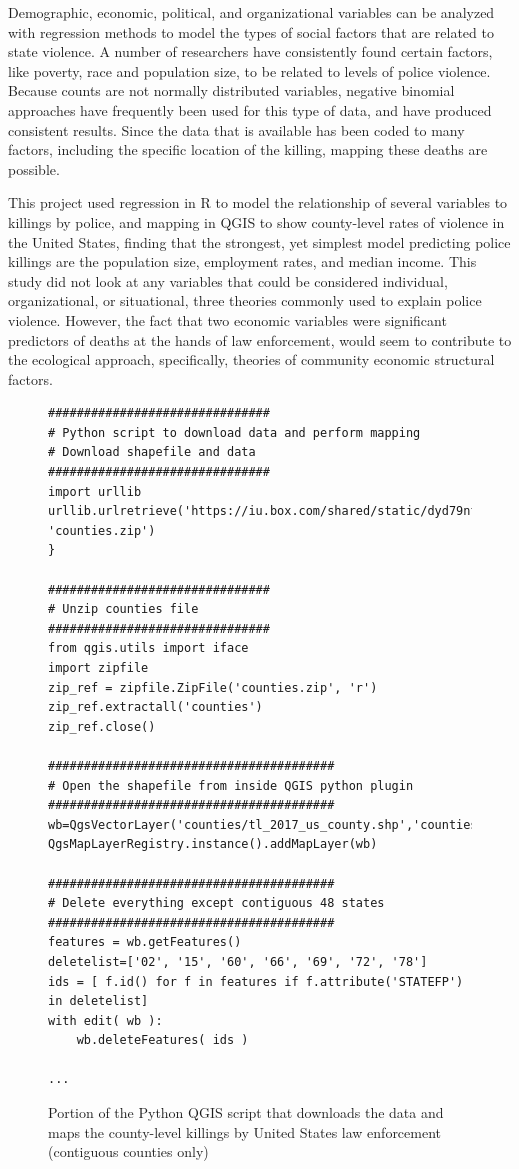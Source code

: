 \documentclass[sigconf]{acmart}
\begin{document}
Demographic, economic, political, and organizational variables can be analyzed with regression methods to model the types of social factors that are related to state violence.  A number of researchers have consistently found certain factors, like poverty, race and population size, to be related to levels of police violence.  Because counts are not normally distributed variables, negative binomial approaches have frequently been used for this type of data, and have produced consistent results.  Since the data that is available has been coded to many factors, including the specific location of the killing, mapping these deaths are possible.  

This project used regression in R to model the relationship of several variables to killings by police, and mapping in QGIS to show county-level rates of violence in the United States, finding that the strongest, yet simplest model predicting police killings are the population size, employment rates, and median income.  This study did not look at any variables that could be considered individual, organizational, or situational, three theories commonly used to explain police violence.  However, the fact that two economic variables were significant predictors of deaths at the hands of law enforcement, would seem to contribute to the ecological approach, specifically, theories of community economic structural factors.

 

\begin{figure}[htb]
\begin{verbatim}
###############################
# Python script to download data and perform mapping
# Download shapefile and data
###############################
import urllib 
urllib.urlretrieve('https://iu.box.com/shared/static/dyd79nfosj25kdqo4hk0me1tmhrbn275.zip', 'counties.zip')
}

###############################
# Unzip counties file
###############################
from qgis.utils import iface
import zipfile
zip_ref = zipfile.ZipFile('counties.zip', 'r')
zip_ref.extractall('counties')
zip_ref.close()

########################################
# Open the shapefile from inside QGIS python plugin
########################################
wb=QgsVectorLayer('counties/tl_2017_us_county.shp','counties','ogr')
QgsMapLayerRegistry.instance().addMapLayer(wb)

########################################
# Delete everything except contiguous 48 states
########################################
features = wb.getFeatures()
deletelist=['02', '15', '60', '66', '69', '72', '78']
ids = [ f.id() for f in features if f.attribute('STATEFP') in deletelist]
with edit( wb ):
    wb.deleteFeatures( ids )

...
\end{verbatim}
\caption{Portion of the Python QGIS script that downloads the data and maps the county-level killings by United States law enforcement (contiguous counties only)}\label{townsleyP}
\end{figure}
\end{document}
